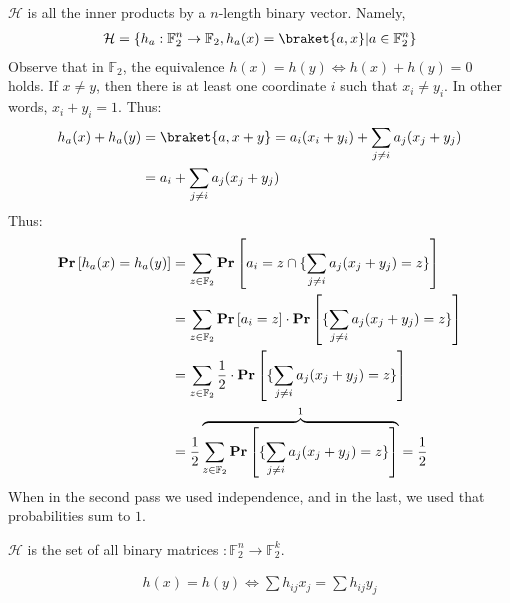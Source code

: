 \begin{example}
  $\mathcal{H}$ is all the inner products by a $n$-length binary vector. Namely, 
  \begin{equation*}
    \begin{split}
  \mathcal{H} = \{ h_{a} :  \mathbb{F}_{2}^{n} \rightarrow \mathbb{F}_2, h_{a}(x) = \braket{a,x} | a \in  \mathbb{F}_{2}^{n}\}
    \end{split}
  \end{equation*}
Observe that in $\mathbb{F}_{2}$, the equivalence $h(x) = h(y) \Leftrightarrow h(x) + h(y) = 0$ holds. If $x \neq y$, then there is at least one coordinate $i$ such that $x_{i} \neq y_{i}$. In other words, $x_{i} + y_{i} = 1$. Thus:
  \begin{equation*}
    \begin{split}
      h_{a}(x) + h_{a}(y) &=  \braket{a, x +y } = a_{i}(x_{i} + y_{i})  +  \sum_{j \neq i } a_{j}( x_{j} + y_{j}) \\ 
      & = a_{i} +  \sum_{j \neq i } a_{j}( x_{j} + y_{j}) 
    \end{split}
  \end{equation*}
  Thus: 
  \begin{equation*}
    \begin{split}
      \mathbf{Pr} \left[  h_{a}(x) = h_{a}(y)   \right] &=  \sum_{z \in \mathbb{F}_{2} } \mathbf{Pr} \left[    a_{i} = z \cap  \{ \sum_{j \neq i } a_{j}( x_{j} + y_{j}) = z \}   \right] \\
    &=  \sum_{z \in \mathbb{F}_{2} } \mathbf{Pr} \left[    a_{i} = z  \right] \cdot \mathbf{Pr} \left[  \{ \sum_{j \neq i } a_{j}( x_{j} + y_{j}) = z \}   \right] \\
    &=   \sum_{z \in \mathbb{F}_{2}} \frac{1}{2} \cdot \mathbf{Pr} \left[  \{ \sum_{j \neq i } a_{j}( x_{j} + y_{j}) = z \}   \right] \\
    &=   \frac{1}{2}\overbrace{\sum_{z \in \mathbb{F}_{2}} \mathbf{Pr} \left[  \{ \sum_{j \neq i } a_{j}( x_{j} + y_{j}) = z \}   \right] }^{ 1}  = \frac{1}{2}
    \end{split}
  \end{equation*}
When in the second pass we used independence, and in the last, we used that probabilities sum to $1$.
\end{example}
\begin{example}
  $\mathcal{H}$ is the set of all binary matrices $ : \mathbb{F}_{2}^{n} \rightarrow \mathbb{F}_{2}^{k}$.


  \begin{equation*}
    \begin{split}
      h(x) = h(y) \Leftrightarrow \sum h_{ij} x_{j} = \sum h_{ij} y_{j} 
    \end{split}
  \end{equation*}

\end{example}

